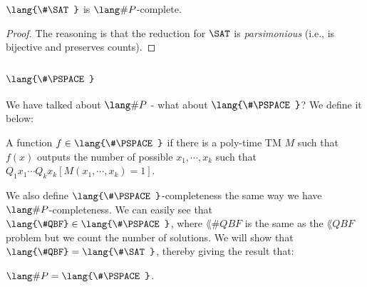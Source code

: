 \newcommand{\SharpSAT}{\lang{\#\SAT}}
\begin{theorem}
$\SharpSAT$ is $\SharpP$-complete.
\end{theorem}

\begin{proof}
The reasoning is that the reduction for $\SAT$ is \emph{parsimonious} (i.e., is bijective and preserves counts). 
\end{proof}

\newcommand{\SharpPSPACE}{\lang{\#\PSPACE}}
\subsection{$\SharpPSPACE$}
We have talked about $\SharpP$ - what about $\SharpPSPACE$? We define it below:
\begin{definition}
A function $f \in \SharpPSPACE$ if there is a poly-time TM $M$ such that $f(x)$ outputs the number of possible $x_1, \cdots, x_k$ such that $Q_1x_1 \cdots Q_kx_k [M(x_1, \cdots, x_k) = 1]$. 
\end{definition}
\newcommand{\SharpQBF}{\lang{\#QBF}}
We also define $\SharpPSPACE$-completeness the same way we have $\SharpP$-completeness. We can easily see that $\SharpQBF \in \SharpPSPACE$, where $\SharpQBF$ is the same as the $\lang{QBF}$ problem but we count the number of solutions. We will show that $\SharpQBF = \SharpSAT$, thereby giving the result that:
\begin{theorem}
$\SharpP = \SharpPSPACE$.
\end{theorem}

